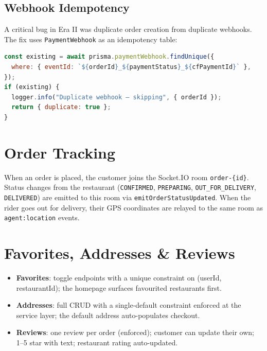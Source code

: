 \documentclass[11pt,a4paper,twoside]{book}
\begin{document}
\subsection{Webhook Idempotency}

A critical bug in Era II was duplicate order creation from duplicate webhooks.
The fix uses \texttt{PaymentWebhook} as an idempotency table:

\begin{lstlisting}[language=JavaScript,caption={Webhook idempotency guard}]
const existing = await prisma.paymentWebhook.findUnique({
  where: { eventId: `${orderId}_${paymentStatus}_${cfPaymentId}` },
});
if (existing) {
  logger.info("Duplicate webhook — skipping", { orderId });
  return { duplicate: true };
}
\end{lstlisting}

\section{Order Tracking}

When an order is placed, the customer joins the Socket.IO room \texttt{order-\{id\}}.
Status changes from the restaurant (\texttt{CONFIRMED}, \texttt{PREPARING},
\texttt{OUT\_FOR\_DELIVERY}, \texttt{DELIVERED}) are emitted to this room via
\texttt{emitOrderStatusUpdated}.  When the rider goes out for delivery, their
GPS coordinates are relayed to the same room as \texttt{agent:location} events.

\section{Favorites, Addresses \& Reviews}

\begin{itemize}[leftmargin=1.4em]
  \item \textbf{Favorites}: toggle endpoints with a unique constraint on (userId, restaurantId); the homepage surfaces favourited restaurants first.
  \item \textbf{Addresses}: full CRUD with a single-default constraint enforced at the service layer; the default address auto-populates checkout.
  \item \textbf{Reviews}: one review per order (enforced); customer can update their own; 1–5 star with text; restaurant rating auto-updated.
\end{itemize}

\end{document}

